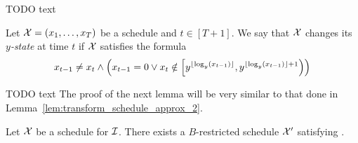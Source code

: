 TODO text
\begin{defn}\label{defn:y_state_changes}
Let $\mathcal{X}=(x_1,\dotsc,x_T)$ be a schedule and $t\in[T+1]$. We say that $\mathcal{X}$ changes its \emph{$y$-state} at time $t$ if $\mathcal{X}$ satisfies the formula
\begin{equation*}
	x_{t-1}\neq x_t\land \left(x_{t-1}=0 \lor x_t\notin\left[y^{\lfloor\log_y(x_{t-1})\rfloor},y^{\lfloor\log_y(x_{t-1})\rfloor+1}\right)\right)
\end{equation*}
\end{defn}




TODO text
The proof of the next lemma will be very similar to that done in Lemma~\ref{lem:transform_schedule_approx_2}.
\begin{lem}
Let $\mathcal{X}$ be a schedule for $\mathcal{I}$. There exists a $B$-restricted schedule $\mathcal{X}'$ satisfying .
\end{lem}
